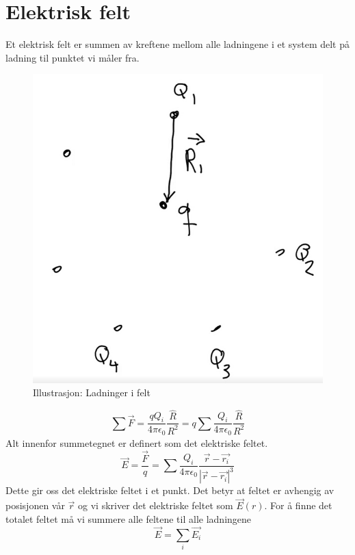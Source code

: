   \section*{Elektrisk felt}
  Et elektrisk felt er summen av kreftene mellom alle ladningene i et system delt på ladning til punktet vi måler fra. 
  \begin{figure}[h!]
    \centering
    \includegraphics[scale = .7]{Bilder/Ladninger_i_felt.png}
    \caption{Illustrasjon: Ladninger i felt}
    \label{fig:Ladninger i felt}
  \end{figure}
  \[
  ∑ \limits_{}^{} \vec{F} = \frac{qQ_i }{4 π \epsilon_0} \frac{\hat{R}}{R^{2}} = q ∑ \limits_{}^{} \frac{Q_i }{4 π \epsilon_0} \frac{\hat{R}}{R^{2}}
  \]
  Alt innenfor summetegnet er definert som det elektriske feltet. 
  \[
  \vec{E} = \frac{\vec{F}}{q} = ∑ \limits_{}^{} \frac{Q_i }{4 π \epsilon_0} \frac{\vec{r} - \vec{r_i}}{\left|\vec{r} - \vec{r_i}\right| ^{3}}
  \]
  Dette gir oss det elektriske feltet i et punkt. Det betyr at feltet er avhengig av posisjonen vår $ \vec{r} $ og vi skriver det elektriske feltet som $ \vec{E}(r) $. For å finne det totalet feltet må vi summere alle feltene til alle ladningene
  \[
  \vec{E} =∑ \limits_{i}^{} \vec{E_i}
  \]
  \newpage 
